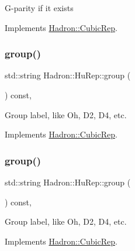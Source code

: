 G-\/parity if it exists 

Implements \mbox{\hyperlink{structHadron_1_1CubicRep_a52104e43266d1614c00bbd1c3b395458}{Hadron\+::\+Cubic\+Rep}}.

\mbox{\label{structHadron_1_1HuRep_ace31fc18f9795a65589ec7014517ac33}} 
\subsubsection{\texorpdfstring{group()}{group()}\hspace{0.1cm}{\footnotesize\ttfamily [1/2]}}
{\footnotesize\ttfamily std\+::string Hadron\+::\+Hu\+Rep\+::group (\begin{DoxyParamCaption}{ }\end{DoxyParamCaption}) const\hspace{0.3cm}{\ttfamily [inline]}, {\ttfamily [virtual]}}

Group label, like Oh, D2, D4, etc. 

Implements \mbox{\hyperlink{structHadron_1_1CubicRep_a0748f11ec87f387062c8e8981339a29c}{Hadron\+::\+Cubic\+Rep}}.

\mbox{\label{structHadron_1_1HuRep_ace31fc18f9795a65589ec7014517ac33}} 
\subsubsection{\texorpdfstring{group()}{group()}\hspace{0.1cm}{\footnotesize\ttfamily [2/2]}}
{\footnotesize\ttfamily std\+::string Hadron\+::\+Hu\+Rep\+::group (\begin{DoxyParamCaption}{ }\end{DoxyParamCaption}) const\hspace{0.3cm}{\ttfamily [inline]}, {\ttfamily [virtual]}}

Group label, like Oh, D2, D4, etc. 

Implements \mbox{\hyperlink{structHadron_1_1CubicRep_a0748f11ec87f387062c8e8981339a29c}{Hadron\+::\+Cubic\+Rep}}.

\mbox{\label{structHadron_1_1HuRep_a6cae988c8d4cbcc28b9573502f672900}} 
